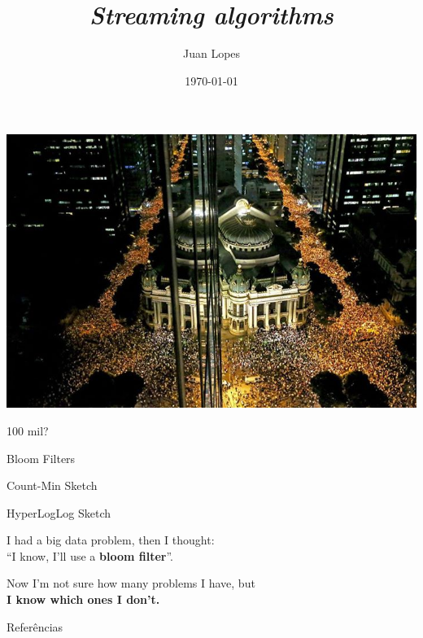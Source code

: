 \documentclass[14pt]{beamer}
\title{\emph{Streaming algorithms}}
\author{Juan Lopes}
\date{\today}
\begin{document}
\begin{frame}
    \maketitle
\end{frame}

\begin{frame}
    \includegraphics[scale=0.4]{figures/riobranco.jpg}

    \smallskip
    
     100 mil?
\end{frame}

\begin{frame}
    Bloom Filters \\ {\tiny\cite{bloom1970space}}

    \bigskip

    Count-Min Sketch \\ {\tiny\cite{cormode2004improved}}
    
    \bigskip
    
    HyperLogLog Sketch \\ {\tiny\cite{flajolet2008hyperloglog}}
\end{frame}

\begin{frame}
I had a big data problem, then I thought: \\ ``I know, I'll use a {\bf bloom filter}''. 

\bigskip

Now I'm not sure how many problems I have, but \\ {\bf I know which ones I don't.}
\end{frame}




\begin{frame}{Referências}
\fontsize{8}{2}


\end{frame}
\end{document}
